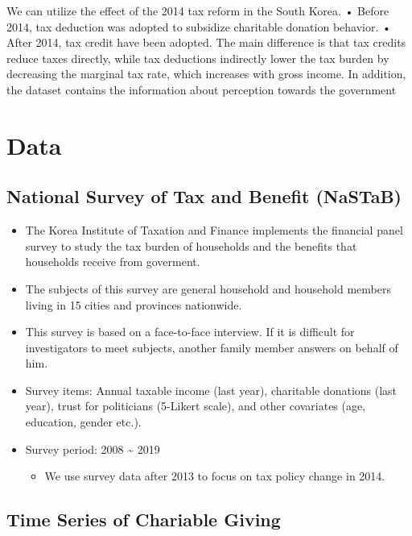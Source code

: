 \documentclass[ review  , 3p ]{elsarticle}
\providecommand{\tightlist}{%
  \setlength{\itemsep}{0pt}\setlength{\parskip}{0pt}}
\begin{document}
  We can utilize the effect of the 2014 tax reform in the South Korea.
  • Before 2014, tax deduction was adopted to subsidize charitable donation behavior.
  • After 2014, tax credit have been adopted.
  The main difference is that tax credits reduce taxes directly, while tax deductions indirectly lower the
  tax burden by decreasing the marginal tax rate, which increases with gross income.
  In addition, the dataset contains the information about perception towards the government
  
  \hypertarget{data}{%
  \section{Data}\label{data}}
  
  \hypertarget{national-survey-of-tax-and-benefit-nastab}{%
  \subsection{National Survey of Tax and Benefit (NaSTaB)}\label{national-survey-of-tax-and-benefit-nastab}}
  
  \begin{itemize}
  \tightlist
  \item
    The Korea Institute of Taxation and Finance implements the financial panel survey to study the tax burden of households and the benefits that households receive from goverment.
  \item
    The subjects of this survey are general household and household members living in 15 cities and provinces nationwide.
  \item
    This survey is based on a face-to-face interview. If it is difficult for investigators to meet subjects, another family member answers on behalf of him.
  \item
    Survey items: Annual taxable income (last year), charitable donations (last year), trust for politicians (5-Likert scale), and other covariates (age, education, gender etc.).
  \item
    Survey period: 2008 \textasciitilde{} 2019
  
    \begin{itemize}
    \tightlist
    \item
      We use survey data after 2013 to focus on tax policy change in 2014.
    \end{itemize}
  \end{itemize}
  
  \hypertarget{time-series-of-chariable-giving}{%
  \subsection{Time Series of Chariable Giving}\label{time-series-of-chariable-giving}}
  
\end{document}
